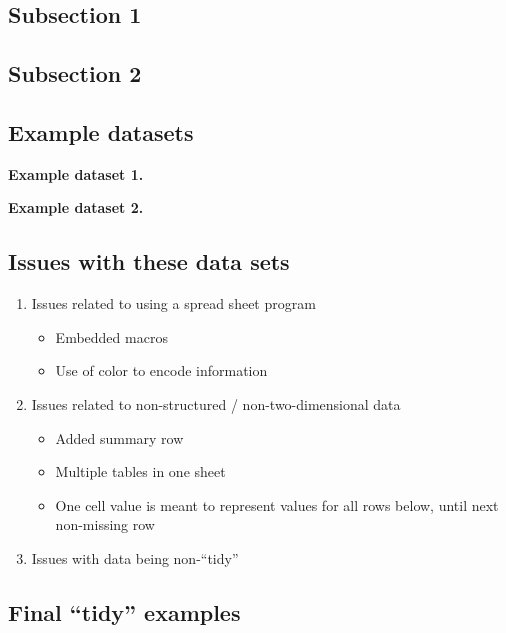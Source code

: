 \documentclass[]{tufte-book}
\providecommand{\tightlist}{%
  \setlength{\itemsep}{0pt}\setlength{\parskip}{0pt}}
\begin{document}
\hypertarget{subsection-1-1}{%
\subsection{Subsection 1}\label{subsection-1-1}}

\hypertarget{subsection-2}{%
\subsection{Subsection 2}\label{subsection-2}}

\hypertarget{example-datasets}{%
\subsection{Example datasets}\label{example-datasets}}

\textbf{Example dataset 1.}

\textbf{Example dataset 2.}

\hypertarget{issues-with-these-data-sets}{%
\subsection{Issues with these data sets}\label{issues-with-these-data-sets}}

\begin{enumerate}
\def\labelenumi{\arabic{enumi}.}
\tightlist
\item
  Issues related to using a spread sheet program

  \begin{itemize}
  \tightlist
  \item
    Embedded macros
  \item
    Use of color to encode information
  \end{itemize}
\item
  Issues related to non-structured / non-two-dimensional data

  \begin{itemize}
  \tightlist
  \item
    Added summary row
  \item
    Multiple tables in one sheet
  \item
    One cell value is meant to represent values for all rows below, until next
    non-missing row
  \end{itemize}
\item
  Issues with data being non-``tidy''
\end{enumerate}

\hypertarget{final-tidy-examples}{%
\subsection{Final ``tidy'' examples}\label{final-tidy-examples}}
\end{document}
